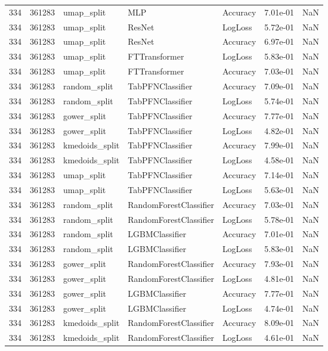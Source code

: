 \begin{tabular}{rrlllrr}
334 & 361283 & umap\_split & MLP & Accuracy & 7.01e-01 & NaN \\
334 & 361283 & umap\_split & ResNet & LogLoss & 5.72e-01 & NaN \\
334 & 361283 & umap\_split & ResNet & Accuracy & 6.97e-01 & NaN \\
334 & 361283 & umap\_split & FTTransformer & LogLoss & 5.83e-01 & NaN \\
334 & 361283 & umap\_split & FTTransformer & Accuracy & 7.03e-01 & NaN \\
334 & 361283 & random\_split & TabPFNClassifier & Accuracy & 7.09e-01 & NaN \\
334 & 361283 & random\_split & TabPFNClassifier & LogLoss & 5.74e-01 & NaN \\
334 & 361283 & gower\_split & TabPFNClassifier & Accuracy & 7.77e-01 & NaN \\
334 & 361283 & gower\_split & TabPFNClassifier & LogLoss & 4.82e-01 & NaN \\
334 & 361283 & kmedoids\_split & TabPFNClassifier & Accuracy & 7.99e-01 & NaN \\
334 & 361283 & kmedoids\_split & TabPFNClassifier & LogLoss & 4.58e-01 & NaN \\
334 & 361283 & umap\_split & TabPFNClassifier & Accuracy & 7.14e-01 & NaN \\
334 & 361283 & umap\_split & TabPFNClassifier & LogLoss & 5.63e-01 & NaN \\
334 & 361283 & random\_split & RandomForestClassifier & Accuracy & 7.03e-01 & NaN \\
334 & 361283 & random\_split & RandomForestClassifier & LogLoss & 5.78e-01 & NaN \\
334 & 361283 & random\_split & LGBMClassifier & Accuracy & 7.01e-01 & NaN \\
334 & 361283 & random\_split & LGBMClassifier & LogLoss & 5.83e-01 & NaN \\
334 & 361283 & gower\_split & RandomForestClassifier & Accuracy & 7.93e-01 & NaN \\
334 & 361283 & gower\_split & RandomForestClassifier & LogLoss & 4.81e-01 & NaN \\
334 & 361283 & gower\_split & LGBMClassifier & Accuracy & 7.77e-01 & NaN \\
334 & 361283 & gower\_split & LGBMClassifier & LogLoss & 4.74e-01 & NaN \\
334 & 361283 & kmedoids\_split & RandomForestClassifier & Accuracy & 8.09e-01 & NaN \\
334 & 361283 & kmedoids\_split & RandomForestClassifier & LogLoss & 4.61e-01 & NaN \\

\end{tabular}
